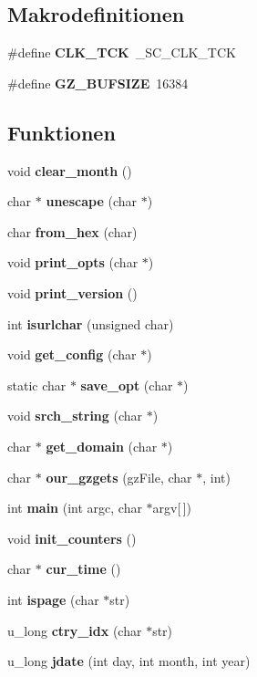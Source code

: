 \subsection*{Makrodefinitionen}
\begin{CompactItemize}
\item 
\#define {\bf CLK\_\-TCK}~\_\-SC\_\-CLK\_\-TCK
\item 
\#define {\bf GZ\_\-BUFSIZE}~16384
\end{CompactItemize}
\subsection*{Funktionen}
\begin{CompactItemize}
\item 
void {\bf clear\_\-month} ()
\item 
char $\ast$ {\bf unescape} (char $\ast$)
\item 
char {\bf from\_\-hex} (char)
\item 
void {\bf print\_\-opts} (char $\ast$)
\item 
void {\bf print\_\-version} ()
\item 
int {\bf isurlchar} (unsigned char)
\item 
void {\bf get\_\-config} (char $\ast$)
\item 
static char $\ast$ {\bf save\_\-opt} (char $\ast$)
\item 
void {\bf srch\_\-string} (char $\ast$)
\item 
char $\ast$ {\bf get\_\-domain} (char $\ast$)
\item 
char $\ast$ {\bf our\_\-gzgets} (gz\-File, char $\ast$, int)
\item 
int {\bf main} (int argc, char $\ast$argv[$\,$])
\item 
void {\bf init\_\-counters} ()
\item 
char $\ast$ {\bf cur\_\-time} ()
\item 
int {\bf ispage} (char $\ast$str)
\item 
u\_\-long {\bf ctry\_\-idx} (char $\ast$str)
\item 
u\_\-long {\bf jdate} (int day, int month, int year)
\end{CompactItemize}

